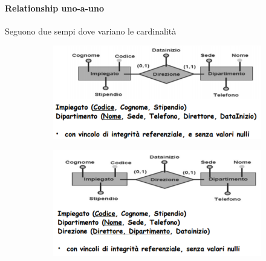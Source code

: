 \paragraph{Relationship uno-a-uno} Seguono due sempi dove variano le cardinalità

\begin{figure}[h]
	\begin{subfigure}{0.5\textwidth}
		\includegraphics[width=0.9\linewidth]{images/127.PNG} 
	\end{subfigure}
	\begin{subfigure}{0.5\textwidth}
		\includegraphics[width=0.9\linewidth]{images/128.PNG}
	\end{subfigure}
\end{figure}